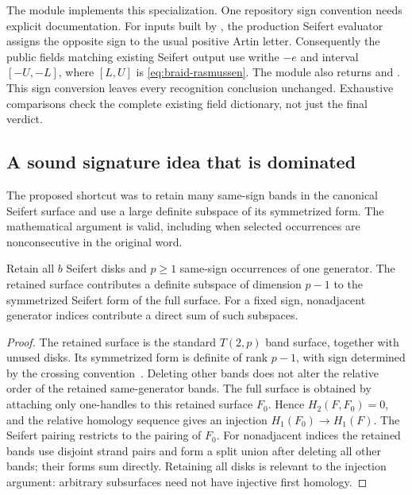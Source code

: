 The module  implements this specialization.
One repository sign convention needs explicit documentation.
For inputs built by , the production Seifert
evaluator assigns the opposite sign to the usual positive Artin letter.
Consequently the public fields matching existing Seifert output use writhe
\(-e\) and interval \([-U,-L]\), where \([L,U]\) is
\eqref{eq:braid-rasmussen}. The module also returns
 and .
This sign conversion leaves every recognition conclusion unchanged.
Exhaustive comparisons check the complete existing field dictionary,
not just the final verdict.

\subsection{A sound signature idea that is dominated}

The proposed shortcut was to retain many same-sign bands in the canonical
Seifert surface and use a large definite subspace of its symmetrized form.
The mathematical argument is valid, including when selected occurrences
are nonconsecutive in the original word.

\begin{lemma}\label{lem:bands}
Retain all \(b\) Seifert disks and \(p\ge1\) same-sign occurrences of one
generator. The retained surface contributes a definite subspace of
dimension \(p-1\) to the symmetrized Seifert form of the full surface.
For a fixed sign, nonadjacent generator indices contribute a direct sum
of such subspaces.
\end{lemma}

\begin{proof}
The retained surface is the standard \(T(2,p)\) band surface, together
with unused disks. Its symmetrized form is definite of rank \(p-1\),
with sign determined by the crossing convention~\cite{feller}.
Deleting other bands does not alter the relative order of the retained
same-generator bands.
The full surface is obtained by attaching only one-handles to this
retained surface \(F_0\). Hence \(H_2(F,F_0)=0\), and the relative
homology sequence gives an injection \(H_1(F_0)\to H_1(F)\).
The Seifert pairing restricts to the pairing of \(F_0\).
For nonadjacent indices the retained bands use disjoint strand pairs and
form a split union after deleting all other bands; their forms sum
directly. Retaining all disks is relevant to the injection argument:
arbitrary subsurfaces need not have injective first homology.
\end{proof}

